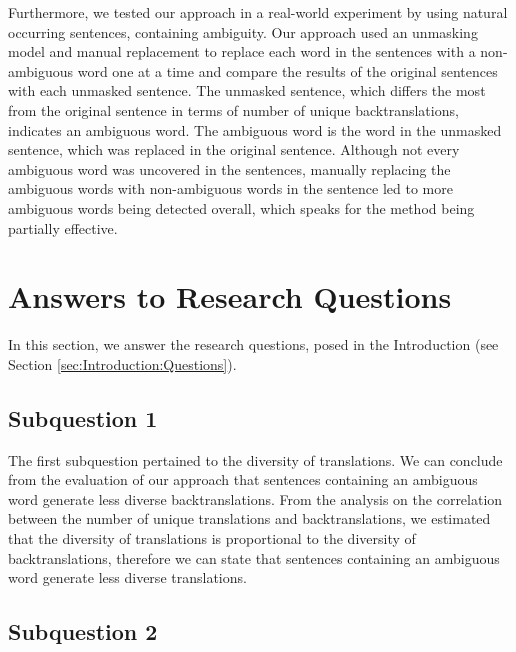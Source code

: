 Furthermore, we tested our approach in a real-world experiment by using natural occurring sentences, containing ambiguity. Our approach used an unmasking model and manual replacement to replace each word in the sentences with a non-ambiguous word one at a time and compare the results of the original sentences with each unmasked sentence. The unmasked sentence, which differs the most from the original sentence in terms of number of unique backtranslations, indicates an ambiguous word. The ambiguous word is the word in the unmasked sentence, which was replaced in the original sentence. Although not every ambiguous word was uncovered in the sentences, manually replacing the ambiguous words with non-ambiguous words in the sentence led to more ambiguous words being detected overall, which speaks for the method being partially effective.

\section{Answers to Research Questions}
\label{sec:Conclusion:Answers}

In this section, we answer the research questions, posed in the Introduction (see Section \ref{sec:Introduction:Questions}).

\subsection{Subquestion 1} %
\label{sec:Discussion:Answers:1}

The first subquestion pertained to the diversity of translations. We can conclude from the evaluation of our approach that sentences containing an ambiguous word generate less diverse backtranslations. From the analysis on the correlation between the number of unique translations and backtranslations, we estimated that the diversity of translations is proportional to the diversity of backtranslations, therefore we can state that sentences containing an ambiguous word generate less diverse translations.

\subsection{Subquestion 2} %
\label{sec:Discussion:Answers:2}

